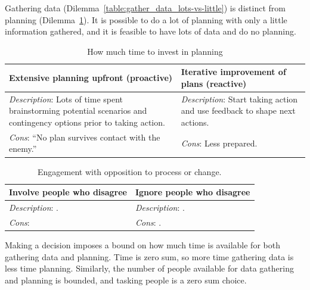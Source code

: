 Gathering data (Dilemma~\ref{table:gather_data_lots-vs-little}) is distinct from planning (Dilemma~\ref{table:planning}). It is possible to do a lot of planning with only a little information gathered, and it is feasible to have lots of data and do no planning. 

\begin{center}
\begin{table}[ht]
\begin{tabular}{ | m{\dilemmatablewidth}| m{\dilemmatablewidth} | } 
  \hline
  \textbf{Extensive planning upfront (proactive)} & 
  \textbf{Iterative improvement of plans (reactive)} \\ 
  \hline
  \textit{Description}: Lots of time spent brainstorming potential scenarios and contingency options prior to taking action. & 
  \textit{Description}: Start taking action and use feedback to shape next actions. \\ 
  \hline
  \textit{Cons}: ``No plan survives contact with the enemy.'' & 
  \textit{Cons}: Less prepared. \\  
  \hline
\end{tabular}
\caption{How much time to invest in planning
}
\label{table:planning}
\end{table}
\end{center}

\begin{center}
\begin{table}[ht]
\begin{tabular}{ | m{\dilemmatablewidth}| m{\dilemmatablewidth} | } 
  \hline
  \textbf{Involve people who disagree} & 
  \textbf{Ignore people who disagree} \\ 
  \hline
  \textit{Description}: . & 
  \textit{Description}: . \\ 
  \hline
  \textit{Cons}:  & 
  \textit{Cons}: . \\  
  \hline
\end{tabular}
\caption{Engagement with opposition to process or change.
}
\label{table:opposition}
\end{table}
\end{center}

Making a decision imposes a bound on how much time is available for both gathering data and planning. Time is zero sum, so more time gathering data is less time planning. Similarly, the number of people available for data gathering and planning is bounded, and tasking people is a zero sum choice.

